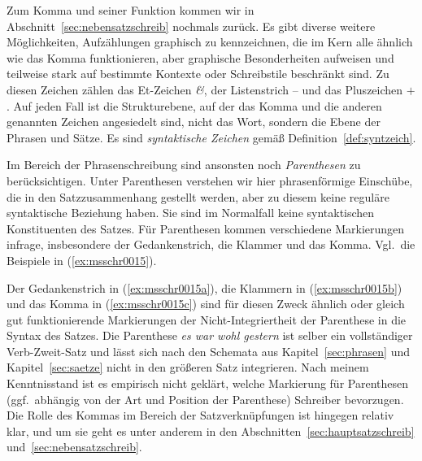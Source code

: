 \begin{exe}
\end{exe}

Zum Komma und seiner Funktion kommen wir in Abschnitt~\ref{sec:nebensatzschreib} nochmals zurück.
Es gibt diverse weitere Möglichkeiten, Aufzählungen graphisch zu kennzeichnen, die im Kern alle ähnlich wie das Komma funktionieren, aber graphische Besonderheiten aufweisen und teilweise stark auf bestimmte Kontexte oder Schreibstile beschränkt sind.
Zu diesen Zeichen zählen das Et-Zeichen \textit{\&}, der Listenstrich -- und das Pluszeichen $+$.
Auf jeden Fall ist die Strukturebene, auf der das Komma und die anderen genannten Zeichen angesiedelt sind, nicht das Wort, sondern die Ebene der Phrasen und Sätze.
Es sind \textit{syntaktische Zeichen} gemäß Definition~\ref{def:syntzeich}.


Im Bereich der Phrasenschreibung sind ansonsten noch \textit{Parenthesen} zu berücksichtigen.
Unter Parenthesen verstehen wir hier phrasenförmige Einschübe, die in den Satzzusammenhang gestellt werden, aber zu diesem keine reguläre syntaktische Beziehung haben.
Sie sind im Normalfall keine syntaktischen Konstituenten des Satzes.
Für Parenthesen kommen verschiedene Markierungen infrage, insbesondere der Gedankenstrich, die Klammer und das Komma.
Vgl.\ die Beispiele in (\ref{ex:msschr0015}).


\begin{exe}
  \ex\label{ex:msschr0015} 
  \begin{xlist}
  \end{xlist}
\end{exe}

Der Gedankenstrich in (\ref{ex:msschr0015a}), die Klammern in (\ref{ex:msschr0015b}) und das Komma in (\ref{ex:msschr0015c}) sind für diesen Zweck ähnlich oder gleich gut funktionierende Markierungen der Nicht-Integriertheit der Parenthese in die Syntax des Satzes.
Die Parenthese \textit{es war wohl gestern} ist selber ein vollständiger Verb-Zweit-Satz und lässt sich nach den Schemata aus Kapitel~\ref{sec:phrasen} und Kapitel~\ref{sec:saetze} nicht in den größeren Satz integrieren.
Nach meinem Kenntnisstand ist es empirisch nicht geklärt, welche Markierung für Parenthesen (ggf.\ abhängig von der Art und Position der Parenthese) Schreiber bevorzugen.
Die Rolle des Kommas im Bereich der Satzverknüpfungen ist hingegen relativ klar, und um sie geht es unter anderem in den Abschnitten~\ref{sec:hauptsatzschreib} und~\ref{sec:nebensatzschreib}.

